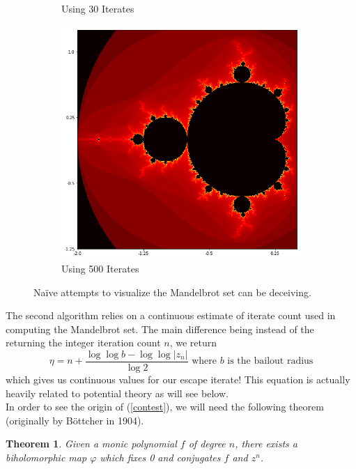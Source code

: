 \documentclass{amsart}
\newcommand{\abs}[1]{ \left| #1 \right| }
\renewcommand{\phi}{\varphi}
\newtheorem{thm}{Theorem}[section]
\theoremstyle{definition}
\theoremstyle{remark}
\numberwithin{equation}{section}
\begin{document}
\begin{figure}[h]
\begin{subfigure}{.33\textwidth}
  \caption{Using 30 Iterates}
\end{subfigure}
\begin{subfigure}{.33\textwidth}
  \centering
  \includegraphics[width=0.9\linewidth]{Mandelbrot_d_500.png}
  \caption{Using 500 Iterates}
\end{subfigure}
\caption{Na\"ive attempts to visualize the Mandelbrot set can be deceiving.}
\label{fig:MandelbrotDIter}
\end{figure}


The second algorithm relies on a continuous estimate of iterate count \cite{Garcia2009} used in computing the Mandelbrot set. The main difference being instead of the returning the integer iteration count $n$, we return
\begin{equation}\label{contest}
\eta= n+\frac{\log\log b-\log \log \abs{z_n}}{\log 2} \text{ where $b$ is the bailout radius}
\end{equation}
which gives us continuous values for our escape iterate! This equation is actually heavily related to potential theory as will see below.\\

In order to see the origin of (\ref{contest}), we will need the following theorem (originally by B\"ottcher in 1904).
\begin{thm}\cite[Theorem 9.1]{milnor2011}\label{Butch}
  Given a monic polynomial $f$ of degree $n$, there exists a biholomorphic map $\phi$ which fixes 0 and conjugates $f$ and $z^n$.
\end{thm}
\end{document}
